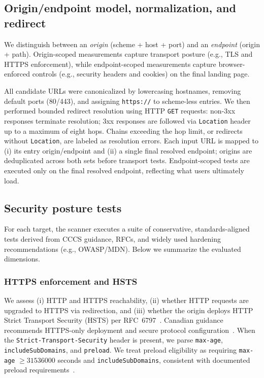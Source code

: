 \documentclass[conference]{IEEEtran}
\begin{document}
\subsection{Origin/endpoint model, normalization, and redirect}
  We distinguish between an \emph{origin} (scheme + host + port) and an \emph{endpoint} (origin + path). Origin-scoped measurements capture transport posture (e.g., TLS and HTTPS enforcement), while endpoint-scoped measurements capture browser-enforced controls (e.g., security headers and cookies) on the final landing page.

  All candidate URLs were canonicalized by lowercasing hostnames, removing default ports (80/443), and assigning \texttt{https://} to scheme-less entries. We then performed bounded redirect resolution using HTTP \texttt{GET} requests: non-3xx responses terminate resolution; 3xx responses are followed via \texttt{Location} header up to a maximum of eight hops. Chains exceeding the hop limit, or redirects without \texttt{Location}, are labeled as resolution errors. Each input URL is mapped to (i) its entry origin/endpoint and (ii) a single final resolved endpoint; origins are deduplicated across both sets before transport tests. Endpoint-scoped tests are executed only on the final resolved endpoint, reflecting what users ultimately load.

\subsection{Security posture tests}
  For each target, the scanner executes a suite of conservative, standards-aligned tests derived from CCCS guidance, RFCs, and widely used hardening recommendations (e.g., OWASP/MDN). Below we summarize the evaluated dimensions.

\subsubsection{HTTPS enforcement and HSTS}
  We assess 
  (i) HTTP and HTTPS reachability, 
  (ii) whether HTTP requests are upgraded to HTTPS via redirection, and 
  (iii) whether the origin deploys HTTP Strict Transport Security (HSTS) per RFC~6797~\cite{rfc6797}. 
  Canadian guidance recommends HTTPS-only deployment and secure protocol configuration~\cite{cccs-itsp-40062,cccs-itsm-60005}. When the \texttt{Strict-Transport-Security} header is present, we parse \texttt{max-age}, \texttt{includeSubDomains}, and \texttt{preload}. We treat preload eligibility as requiring \texttt{max-age} $\ge 31536000$ seconds and \texttt{includeSubDomains}, consistent with documented preload requirements~\cite{mdn_sts_header,chromium_hsts_preload}.
\end{document}
